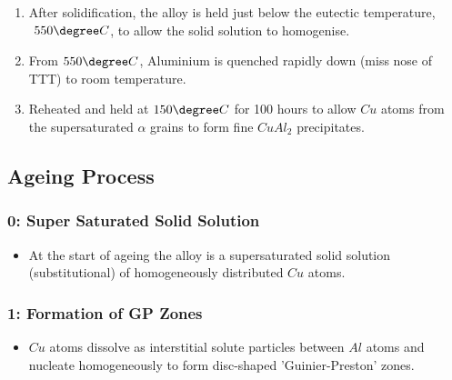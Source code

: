 

\begin{enumerate}
  \item After solidification, the alloy is held just below the eutectic temperature,$~550 \degree C$, to allow the solid solution to homogenise.
  \item From $550 \degree C$, Aluminium is quenched rapidly down (miss nose of TTT) to room temperature. 
  \item Reheated and held at $150 \degree C$ for 100 hours to allow $Cu$ atoms from the supersaturated $\alpha$ grains to form fine $CuAl_2$ precipitates.
\end{enumerate}


\newpage
\subsection{Ageing Process} %
\label{sub:ageing}

\subsubsection{0: Super Saturated Solid Solution} %
\label{ssub:solid_solution}



\begin{itemize}
  \item At the start of ageing the alloy is a supersaturated solid solution (substitutional) of homogeneously distributed $Cu$ atoms.
\end{itemize}


\subsubsection{1: Formation of GP Zones} %
\label{ssub:gp_zones}


\begin{itemize}
  \item $Cu$ atoms dissolve as interstitial solute particles between $Al$ atoms and nucleate homogeneously to form disc-shaped 'Guinier-Preston' zones.
\end{itemize}

